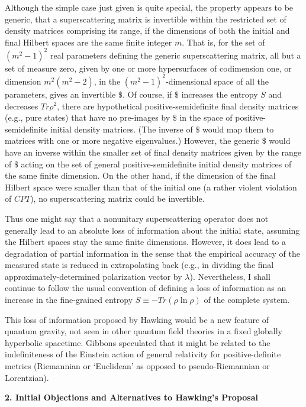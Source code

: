 \documentclass[12pt]{article}
\begin{document}
     Although the simple case just given is quite special, the
property appears
to be generic, that a superscattering matrix is invertible within the
restricted set
of density matrices comprising its range, if the dimensions of both
the initial
and final Hilbert spaces are the same finite integer $m$.  That is,
for the set
of $(m^2-1)^2$ real parameters defining the generic superscattering
matrix,
all but a set of measure zero, given by one or more hypersurfaces of
codimension one, or dimension $m^2(m^2-2)$, in the
$(m^2-1)^2$-dimensional
space of all the parameters, gives an invertible $\$$.  Of course, if
$\$$
increases the entropy $S$ and decreases $Tr\rho^2$, there are
hypothetical
positive-semidefinite final density matrices (e.g., pure states) that
have no
pre-images by $\$$ in the space of positive-semidefinite initial
density
matrices.
(The inverse of $\$$ would map them to matrices with one or more
negative
eigenvalues.)  However, the generic $\$$ would have an inverse within
the
smaller set of final density matrices given by the range of $\$$
acting on the
set of general positive-semidefinite initial density matrices of the
same
finite
dimension.  On the other hand, if the dimension of the final Hilbert
space
were smaller than that of the initial one (a rather violent violation
of
$CPT$),
no superscattering matrix could be invertible.

     Thus
one might say that a nonunitary superscattering operator does not
generally
lead to an absolute loss of information about the initial state,
assuming
the Hilbert spaces stay the same finite dimensions. However, it does
lead to a degradation of partial information in the sense that the
empirical
accuracy of the measured state is reduced in extrapolating back
(e.g., in
dividing the final approximately-determined polarization vector by
$\lambda$).
Nevertheless, I shall continue to follow the usual convention of
defining a
loss of information as an increase in the fine-grained entropy
$S\equiv-Tr(\rho\ln\rho)$ of the complete system.

     This loss of information proposed by Hawking would be a new
feature
of quantum gravity, not seen in other quantum field theories in a
fixed
globally hyperbolic spacetime.  Gibbons \cite{Gib77} speculated that
it might be related to the indefiniteness of the Einstein action of
general
relativity for positive-definite metrics (Riemannian or `Euclidean'
as
opposed to pseudo-Riemannian or Lorentzian).

\vspace{5 mm}
{\bf 2.  Initial Objections and Alternatives to Hawking's Proposal}
\vspace{5 mm}
\end{document}
